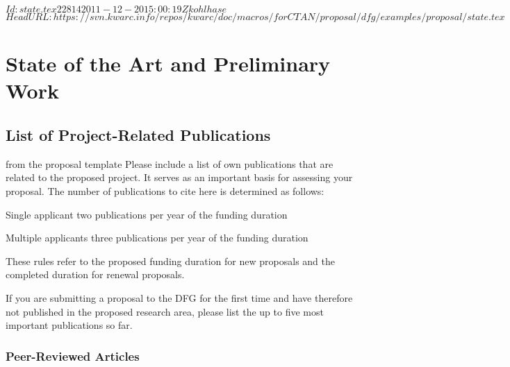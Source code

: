 \svnInfo $Id: state.tex 22814 2011-12-20 15:00:19Z kohlhase $
\svnKeyword $HeadURL: https://svn.kwarc.info/repos/kwarc/doc/macros/forCTAN/proposal/dfg/examples/proposal/state.tex $

\section{State of the Art and Preliminary Work }\label{stand}

\subsection{List of Project-Related Publications }

\begin{todo}{from the proposal template}
  Please include a list of own publications that are related to the proposed project. It
  serves as an important basis for assessing your proposal. The number of publications to
  cite here is determined as follows:
  \begin{compactdesc}
    \item[Single applicant] two publications per year of the funding duration
    \item[Multiple applicants] three publications per year of the funding duration
    \end{compactdesc}
    These rules refer to the proposed funding duration for new proposals and the completed
    duration for renewal proposals.
    
    If you are submitting a proposal to the DFG for the first time and have therefore not
    published in the proposed research area, please list the up to five most important
    publications so far.
\end{todo}

\subsubsection{Peer-Reviewed Articles }



